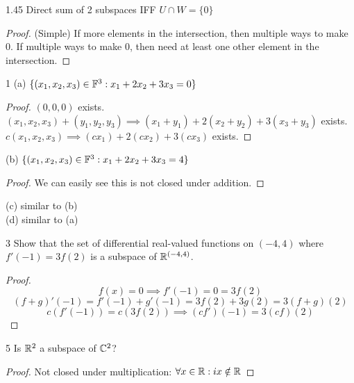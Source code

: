 \documentclass[12pt, letterpaper]{article}
\begin{document}
\begin{imp}{1.45 Direct sum of 2 subspaces}
IFF $U \cap W = \{0\}$
\begin{proof} (Simple)
If more elements in the intersection, then multiple ways to make 0.
If multiple ways to make 0, then need at least one other element in the intersection.
\end{proof}
\end{imp}

\begin{problem}{1}
(a) $\{(x_1,x_2,x_3)\in\mathbb{F}^3:x_1+2x_2+3x_3=0\}$
\begin{proof}
$(0,0,0)$ exists.
$(x_1,x_2,x_3) + (y_1,y_2,y_3) \implies (x_1+y_1)+2(x_2+y_2)+3(x_3+y_3)$ exists.
$c(x_1,x_2,x_3) \implies (cx_1)+2(cx_2)+3(cx_3)$ exists.
\end{proof}
(b) $\{(x_1,x_2,x_3)\in\mathbb{F}^3:x_1+2x_2+3x_3=4\}$
\begin{proof}
We can easily see this is not closed under addition.
\end{proof}
(c) similar to (b)\\
(d) similar to (a)
\end{problem}

\begin{problem}{3}
Show that the set of differential real-valued functions on $(-4,4)$
where $f'(-1)=3f(2)$ is a subspace of $\mathbb{R}^{(-4,4)}$.
\end{problem}
\begin{proof}
$$f(x) = 0 \implies f'(-1) = 0 = 3f(2)$$
$$(f+g)'(-1)=f'(-1)+g'(-1)=3f(2)+3g(2)=3(f+g)(2)$$
$$c(f'(-1))=c(3f(2))\implies (cf')(-1)=3(cf)(2)$$
\end{proof}

\begin{problem}{5}
Is $\mathbb{R}^2$ a subspace of $\mathbb{C}^2$?
\end{problem}
\begin{proof}
Not closed under multiplication: $\forall x\in \mathbb{R}: ix\notin\mathbb{R}$
\end{proof}
\end{document}
